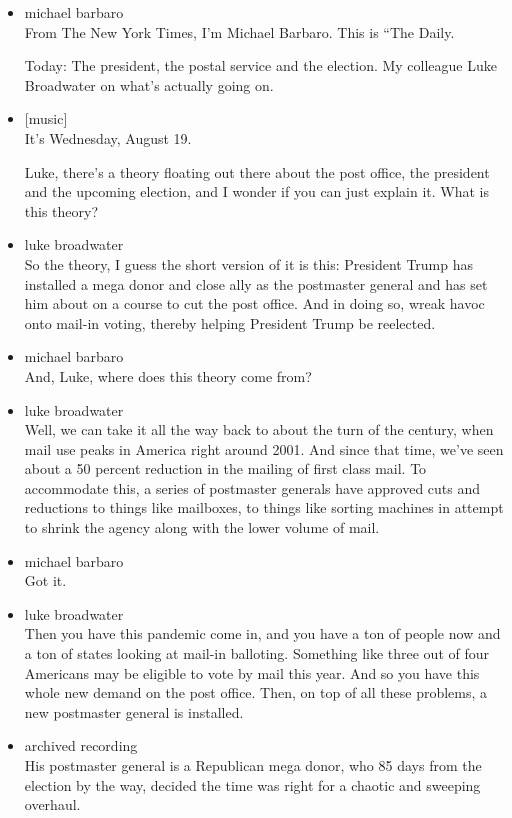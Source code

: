 \begin{itemize}
\item
  michael barbaro\\
  From The New York Times, I'm Michael Barbaro. This is ``The Daily.

  Today: The president, the postal service and the election. My
  colleague Luke Broadwater on what's actually going on.
\item
  {[}music{]}\\
  It's Wednesday, August 19.

  Luke, there's a theory floating out there about the post office, the
  president and the upcoming election, and I wonder if you can just
  explain it. What is this theory?
\item
  luke broadwater\\
  So the theory, I guess the short version of it is this: President
  Trump has installed a mega donor and close ally as the postmaster
  general and has set him about on a course to cut the post office. And
  in doing so, wreak havoc onto mail-in voting, thereby helping
  President Trump be reelected.
\item
  michael barbaro\\
  And, Luke, where does this theory come from?
\item
  luke broadwater\\
  Well, we can take it all the way back to about the turn of the
  century, when mail use peaks in America right around 2001. And since
  that time, we've seen about a 50 percent reduction in the mailing of
  first class mail. To accommodate this, a series of postmaster generals
  have approved cuts and reductions to things like mailboxes, to things
  like sorting machines in attempt to shrink the agency along with the
  lower volume of mail.
\item
  michael barbaro\\
  Got it.
\item
  luke broadwater\\
  Then you have this pandemic come in, and you have a ton of people now
  and a ton of states looking at mail-in balloting. Something like three
  out of four Americans may be eligible to vote by mail this year. And
  so you have this whole new demand on the post office. Then, on top of
  all these problems, a new postmaster general is installed.
\item
  archived recording\\
  His postmaster general is a Republican mega donor, who 85 days from
  the election by the way, decided the time was right for a chaotic and
  sweeping overhaul.
\end{itemize}

